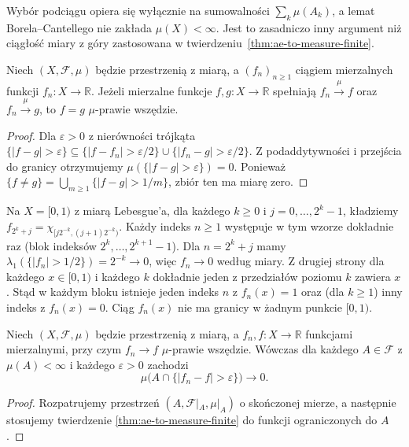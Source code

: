 \begin{uwaga}
Wybór podciągu opiera się wyłącznie na sumowalności
$\sum_k\mu(A_k)$, a lemat Borela--Cantellego nie
zakłada $\mu(X)<\infty$. Jest to zasadniczo inny
argument niż ciągłość miary z góry zastosowana w
twierdzeniu~\ref{thm:ae-to-measure-finite}.
\end{uwaga}

\begin{wniosek}
\label{cor:measure-limit-unique}
Niech $(X,\mathcal F,\mu)$ będzie przestrzenią z miarą,
a $(f_n)_{n\ge1}$ ciągiem mierzalnych funkcji
$f_n:X\to\mathbb R$. Jeżeli mierzalne funkcje
$f,g:X\to\mathbb R$ spełniają $f_n\xrightarrow{\mu}f$
oraz $f_n\xrightarrow{\mu}g$, to $f=g$ $\mu$-prawie wszędzie.
\end{wniosek}
\begin{proof}
Dla $\varepsilon>0$ z nierówności trójkąta
$\{|f-g|>\varepsilon\}\subseteq
\{|f-f_n|>\varepsilon/2\}\cup
\{|f_n-g|>\varepsilon/2\}$.
Z podaddytywności i przejścia do granicy
otrzymujemy $\mu(\{|f-g|>\varepsilon\})=0$.
Ponieważ $\{f\ne g\}=\bigcup_{m\ge1}\{|f-g|>1/m\}$,
zbiór ten ma miarę zero.
\end{proof}

\begin{przyklad}
\label{ex:typewriter}
Na $X=[0,1)$ z miarą Lebesgue'a, dla każdego $k\ge0$
i $j=0,\ldots,2^k-1$, kładziemy
$f_{2^k+j}=\chi_{[j2^{-k},(j+1)2^{-k})}$.
Każdy indeks $n\ge1$ występuje w tym wzorze dokładnie
raz (blok indeksów $2^k,\ldots,2^{k+1}-1$).
Dla $n=2^k+j$ mamy
$\lambda_1(\{|f_n|>1/2\})=2^{-k}\to0$,
więc $f_n\to0$ według miary.
Z drugiej strony dla każdego $x\in[0,1)$ i każdego
$k$ dokładnie jeden z przedziałów poziomu $k$
zawiera $x$. Stąd w każdym bloku istnieje jeden indeks
$n$ z $f_n(x)=1$ oraz (dla $k\ge1$) inny indeks
z $f_n(x)=0$. Ciąg $f_n(x)$ nie ma granicy w żadnym
punkcie $[0,1)$.
\end{przyklad}

\begin{twierdzenie}
\label{thm:local-convergence-measure}
Niech $(X,\mathcal F,\mu)$ będzie przestrzenią z miarą,
a $f_n,f:X\to\mathbb R$ funkcjami mierzalnymi,
przy czym $f_n\to f$ $\mu$-prawie wszędzie.
Wówczas dla każdego $A\in\mathcal F$ z $\mu(A)<\infty$
i każdego $\varepsilon>0$ zachodzi
\[
\mu\bigl(A\cap\{|f_n-f|>\varepsilon\}\bigr)\longrightarrow0.
\]
\end{twierdzenie}
\begin{proof}
Rozpatrujemy przestrzeń
$(A,\mathcal F|_A,\mu|_A)$ o skończonej mierze,
a następnie stosujemy twierdzenie
\ref{thm:ae-to-measure-finite} do funkcji ograniczonych
do $A$.
\end{proof}

